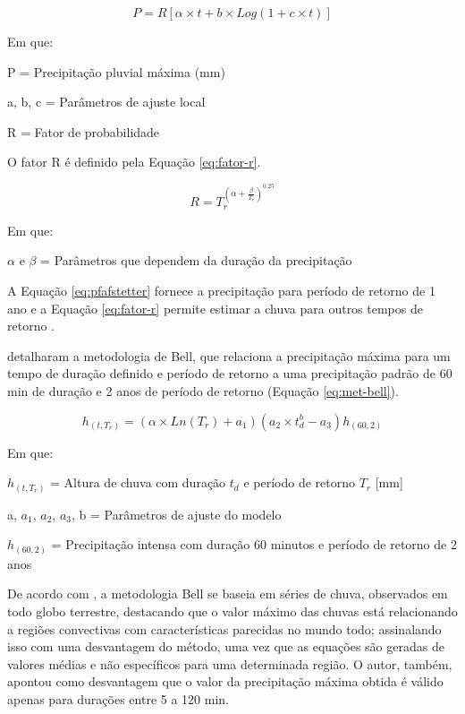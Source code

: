\begin{equation}
\label{eq:pfafstetter}
    P=R[\alpha \times t + b \times Log(1 + c \times t)]
\end{equation}

Em que:

P = Precipitação pluvial máxima (mm)

a, b, c = Parâmetros de ajuste local

R = Fator de probabilidade

O fator R é definido pela Equação \ref{eq:fator-r}.

\begin{equation}
\label{eq:fator-r}
    R = T_r^{(\alpha + \frac{\beta}{T_r})^{0.25}}
\end{equation}

Em que:

$\alpha$ e $\beta$ = Parâmetros que dependem da duração da precipitação

A Equação \ref{eq:pfafstetter} fornece a precipitação para período de retorno de 1 ano e a Equação \ref{eq:fator-r} permite estimar a chuva para outros tempos de retorno \cite{tucci1993}.

 detalharam a metodologia de Bell, que relaciona a precipitação máxima para um tempo de duração definido e período de retorno a uma precipitação padrão de 60 min de duração e 2 anos de período de retorno (Equação \ref{eq:met-bell}).

\begin{equation}
\label{eq:met-bell}
    h_{(t,T_r)} = (\alpha \times Ln(T_r) + a_1)(a_2 \times t_d^b - a_3)h_{(60,2)}
\end{equation}

Em que:

$h_(t, T_r)$ = Altura de chuva com duração $t_d$ e período de retorno $T_r$ [mm]

a, $a_1$, $a_2$, $a_3$, b = Parâmetros de ajuste do modelo

$h_{(60,2)}$ = Precipitação intensa com duração 60 minutos e período de retorno de 2 anos

De acordo com , a metodologia Bell se baseia em séries de chuva, observados em todo globo terrestre, destacando que o valor máximo das chuvas está relacionando a regiões convectivas com características parecidas no mundo todo; assinalando isso com uma desvantagem do método, uma vez que as equações são geradas de valores médias e não específicos para uma determinada região. O autor, também, apontou como desvantagem que o valor da precipitação máxima obtida é válido apenas para durações entre 5 a 120 min.

